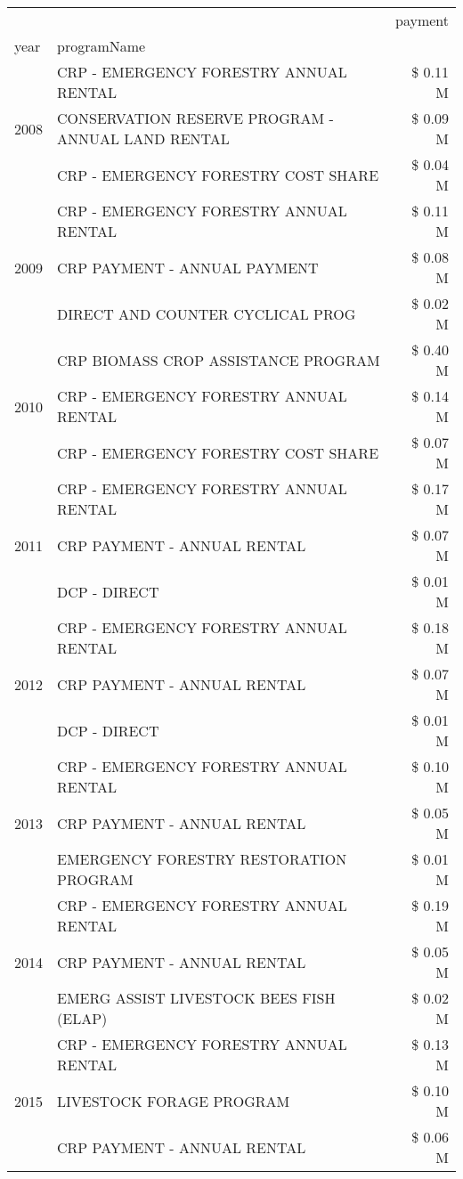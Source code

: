 \begin{tabular}{llr}
\toprule
 &  & payment \\
year & programName &  \\
\midrule
\multirow[t]{3}{*}{2008} & CRP - EMERGENCY FORESTRY ANNUAL RENTAL & \$ 0.11 M \\
 & CONSERVATION RESERVE PROGRAM - ANNUAL LAND RENTAL & \$ 0.09 M \\
 & CRP - EMERGENCY FORESTRY COST SHARE & \$ 0.04 M \\
\cline{1-3}
\multirow[t]{3}{*}{2009} & CRP - EMERGENCY FORESTRY ANNUAL RENTAL & \$ 0.11 M \\
 & CRP PAYMENT - ANNUAL PAYMENT & \$ 0.08 M \\
 & DIRECT AND COUNTER CYCLICAL PROG & \$ 0.02 M \\
\cline{1-3}
\multirow[t]{3}{*}{2010} & CRP BIOMASS CROP ASSISTANCE PROGRAM & \$ 0.40 M \\
 & CRP - EMERGENCY FORESTRY ANNUAL RENTAL & \$ 0.14 M \\
 & CRP - EMERGENCY FORESTRY COST SHARE & \$ 0.07 M \\
\cline{1-3}
\multirow[t]{3}{*}{2011} & CRP - EMERGENCY FORESTRY ANNUAL RENTAL & \$ 0.17 M \\
 & CRP PAYMENT - ANNUAL RENTAL & \$ 0.07 M \\
 & DCP - DIRECT & \$ 0.01 M \\
\cline{1-3}
\multirow[t]{3}{*}{2012} & CRP - EMERGENCY FORESTRY ANNUAL RENTAL & \$ 0.18 M \\
 & CRP PAYMENT - ANNUAL RENTAL & \$ 0.07 M \\
 & DCP - DIRECT & \$ 0.01 M \\
\cline{1-3}
\multirow[t]{3}{*}{2013} & CRP - EMERGENCY FORESTRY ANNUAL RENTAL & \$ 0.10 M \\
 & CRP PAYMENT - ANNUAL RENTAL & \$ 0.05 M \\
 & EMERGENCY FORESTRY RESTORATION PROGRAM & \$ 0.01 M \\
\cline{1-3}
\multirow[t]{3}{*}{2014} & CRP - EMERGENCY FORESTRY ANNUAL RENTAL & \$ 0.19 M \\
 & CRP PAYMENT - ANNUAL RENTAL & \$ 0.05 M \\
 & EMERG ASSIST LIVESTOCK BEES FISH (ELAP) & \$ 0.02 M \\
\cline{1-3}
\multirow[t]{3}{*}{2015} & CRP - EMERGENCY FORESTRY ANNUAL RENTAL & \$ 0.13 M \\
 & LIVESTOCK FORAGE PROGRAM & \$ 0.10 M \\
 & CRP PAYMENT - ANNUAL RENTAL & \$ 0.06 M \\

\end{tabular}
